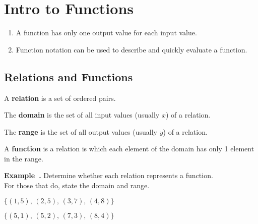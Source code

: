\documentclass{article}
\newcounter{example}[section]
\newenvironment{example}[1][]{\refstepcounter{example}\par\medskip
   {\color{red}\textbf{Example~\theexample. #1}}}{\medskip}
\begin{document}
\section*{Intro to Functions}

\begin{tcolorbox}[colframe=orange!70!white, coltitle=black, title=\textbf{Summary}]
\begin{enumerate}
    \item A function has only one output value for each input value.
    \item Function notation can be used to describe and quickly evaluate a function.
\end{enumerate}
\end{tcolorbox}
\bigskip 

\subsection*{Relations and Functions}


\begin{tcolorbox}[colframe=green!80!blue, coltitle=white, title=\textbf{Relations}]
A \textbf{relation} is a set of ordered pairs.
\end{tcolorbox}
\bigskip  

\begin{tcolorbox}[colframe=green!80!blue, coltitle=white, title=\textbf{Domain}]
The \textbf{domain} is the set of all input values (usually $x$) of a relation.
\end{tcolorbox}
\bigskip  

\begin{tcolorbox}[colframe=green!80!blue, coltitle=white, title=\textbf{Range}]
The \textbf{range} is the set of all output values (usually $y$) of a relation.
\end{tcolorbox}
\bigskip 

\begin{tcolorbox}[colframe=green!80!blue, coltitle=white, title=\textbf{Function}]
A \textbf{function} is a relation is which each element of the domain has only 1 element in the range.
\end{tcolorbox}
\bigskip  

\begin{example} 
Determine whether each relation represents a function. \\
For those that do, state the domain and range.
\begin{enumerate}[(a)]
\begin{multicols}{2}
    \item $\{(1,5), \, (2, 5), \, (3, 7), \, (4, 8)\}$ \label{ex1a}
    \item $\{(5,1), \, (5,2), \, (7,3), \, (8,4)\}$ \label{ex1b}
\end{multicols}
\end{enumerate}
\end{example}
\vfill 
\end{document}
